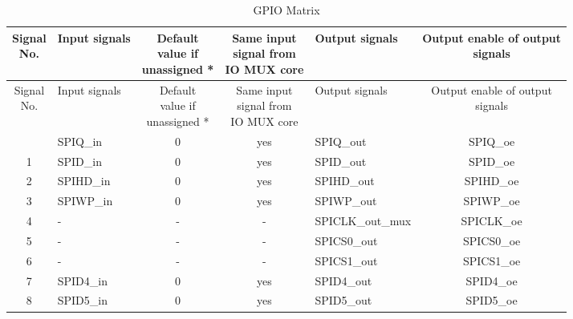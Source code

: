 

\begin{longtable}[c]{|c|l|c|c|l|c|}
\caption{GPIO Matrix}\label{table:peripheral_signals}
\\\hline
\rowcolor{lightgray}
\makecell[c]{Signal\\ No.} & Input signals & \makecell[c]{Default\\ value if \\unassigned *} & \makecell[c]{Same input\\ signal from\\ IO MUX core} & Output signals & \makecell[c]{Output enable of output \\signals} \\\hline  
\endfirsthead
\hline
\rowcolor{lightgray}

\makecell[c]{Signal\\ No.} & Input signals & \makecell[c]{Default\\ value if\\ unassigned *} & \makecell[c]{Same input\\ signal from\\ IO MUX core} & Output signals & \makecell[c]{Output enable of output \\signals} \\\hline
\endhead
\endfoot
\hline
\endlastfoot
 0  &                 SPIQ\_in  &  0  &  yes  &               SPIQ\_out  &           SPIQ\_oe  \\\hline
  1  &                 SPID\_in  &  0  &  yes  &               SPID\_out  &           SPID\_oe  \\\hline
  2  &                SPIHD\_in  &  0  &  yes  &              SPIHD\_out  &          SPIHD\_oe  \\\hline
  3  &                SPIWP\_in  &  0  &  yes  &              SPIWP\_out  &          SPIWP\_oe  \\\hline
  4  &                        -  &  -  &    -  &        SPICLK\_out\_mux  &         SPICLK\_oe  \\\hline
  5  &                        -  &  -  &    -  &             SPICS0\_out  &         SPICS0\_oe  \\\hline
  6  &                        -  &  -  &    -  &             SPICS1\_out  &         SPICS1\_oe  \\\hline
  7  &                SPID4\_in  &  0  &  yes  &              SPID4\_out  &          SPID4\_oe  \\\hline
  8  &                SPID5\_in  &  0  &  yes  &              SPID5\_out  &          SPID5\_oe  \\\hline

\end{longtable}
